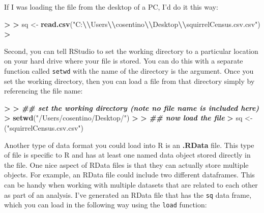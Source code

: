 \documentclass[
]{book}
\newenvironment{Shaded}{\begin{snugshade}}{\end{snugshade}}
\newcommand{\DocumentationTok}[1]{\textcolor[rgb]{0.56,0.35,0.01}{\textbf{\textit{#1}}}}
\newcommand{\ErrorTok}[1]{\textcolor[rgb]{0.64,0.00,0.00}{\textbf{#1}}}
\newcommand{\FunctionTok}[1]{\textcolor[rgb]{0.13,0.29,0.53}{\textbf{#1}}}
\newcommand{\NormalTok}[1]{#1}
\newcommand{\OtherTok}[1]{\textcolor[rgb]{0.56,0.35,0.01}{#1}}
\newcommand{\SpecialCharTok}[1]{\textcolor[rgb]{0.81,0.36,0.00}{\textbf{#1}}}
\newcommand{\StringTok}[1]{\textcolor[rgb]{0.31,0.60,0.02}{#1}}
\begin{document}
If I was loading the file from the desktop of a PC, I'd do it this way:

\begin{Shaded}
\begin{Highlighting}[]
\SpecialCharTok{\textgreater{}} 
\ErrorTok{\textgreater{}}\NormalTok{ sq }\OtherTok{\textless{}{-}} \FunctionTok{read.csv}\NormalTok{(}\StringTok{"C:}\SpecialCharTok{\textbackslash{}\textbackslash{}}\StringTok{Users}\SpecialCharTok{\textbackslash{}\textbackslash{}}\StringTok{cosentino}\SpecialCharTok{\textbackslash{}\textbackslash{}}\StringTok{Desktop}\SpecialCharTok{\textbackslash{}\textbackslash{}}\StringTok{squirrelCensus.csv.csv"}\NormalTok{)}
\SpecialCharTok{\textgreater{}} 
\end{Highlighting}
\end{Shaded}

Second, you can tell RStudio to set the working directory to a particular location on your hard drive where your file is stored. You can do this with a separate function called \texttt{setwd} with the name of the directory is the argument. Once you set the working directory, then you can load a file from that directory simply by referencing the file name:

\begin{Shaded}
\begin{Highlighting}[]
\SpecialCharTok{\textgreater{}} 
\ErrorTok{\textgreater{}} \DocumentationTok{\#\# set the working directory (note no file name is included here)}
\ErrorTok{\textgreater{}} \FunctionTok{setwd}\NormalTok{(}\StringTok{"/Users/cosentino/Desktop/"}\NormalTok{)}
\SpecialCharTok{\textgreater{}} 
\ErrorTok{\textgreater{}} \DocumentationTok{\#\# now load the file }
\ErrorTok{\textgreater{}}\NormalTok{ sq }\OtherTok{\textless{}{-}}\NormalTok{ (}\StringTok{"squirrelCensus.csv.csv"}\NormalTok{)}
\end{Highlighting}
\end{Shaded}

Another type of data format you could load into R is an \textbf{.RData} file. This type of file is specific to R and has at least one named data object stored directly in the file. One nice aspect of RData files is that they can actually store multiple objects. For example, an RData file could include two different dataframes. This can be handy when working with multiple datasets that are related to each other as part of an analysis. I've generated an RData file that has the \texttt{sq} data frame, which you can load in the following way using the \texttt{load} function:
\end{document}
